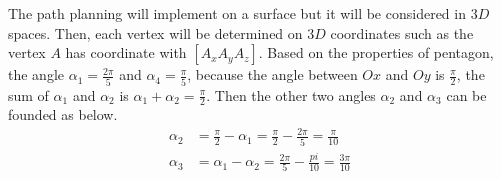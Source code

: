 \noindent The path planning will implement on a surface but it will be considered in $3D$ spaces. 
Then, each vertex will be determined on $3D$ coordinates such as the vertex $A$ has coordinate with $[A_x A_y A_z]$. 
Based on the properties of pentagon, the angle $\alpha_1=\frac{2\pi}{5}$ and $\alpha_4=\frac{\pi}{5}$, 
because the angle between $Ox$ and $Oy$ is $\frac{\pi}{2}$, the sum of $\alpha_1$ and $\alpha_2$ is $\alpha_1 + \alpha_2 = \frac{\pi}{2}$. 
Then the other two angles $\alpha_2$ and $\alpha_3$ can be founded as below. 
\begin{equation*} 
\label{equa:eq0}
\begin{split}
\alpha_2 &= \frac{\pi}{2}-\alpha_1 = \frac{\pi}{2}-\frac{2\pi}{5} = \frac{\pi}{10}\\ 
\alpha_3 &= \alpha_1-\alpha_2 = \frac{2\pi}{5}-\frac{pi}{10} = \frac{3\pi}{10}
\end{split}
\end{equation*}

